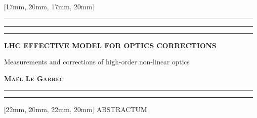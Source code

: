 \documentclass[coverheight=240mm,
               coverwidth=175mm, 
               spinewidth=15mm,
               markcolor=black,
               bleedwidth=0mm,
               marklength=0mm]{bookcover}
\begin{document}
    
\begin{bookcover}








[17mm, 20mm, 17mm, 20mm] %
{
    \noindent\rule[0.5em]{\partwidth}{1.5pt}\vspace{-22pt}
    \noindent\rule[0.5em]{\partwidth}{1.5pt}\vspace{-22pt}
    \noindent\rule[0.5em]{\partwidth}{1.5pt}
    \vspace{0.5cm}
    \fontsize{33pt}{30pt}\selectfont%
    \begin{flushright}%
        \bfseries
        \MakeUppercase{
            LHC Effective Model for Optics Corrections
        }%
    \end{flushright}
    \vspace{.1em}
    \fontsize{11pt}{15pt}\selectfont%
    \begin{flushright}%
        Measurements and corrections of high-order non-linear optics
    \end{flushright}
    \vfill
    \fontsize{15pt}{0pt}\selectfont%
    \bfseries\noindent\scshape Maël Le Garrec
    \par
    \vspace{0.3em}
    \noindent\rule[0.5em]{\partwidth}{1.5pt}\vspace{-2pt}
    \noindent\rule[0.5em]{\partwidth}{1.5pt}
}


[22mm, 20mm, 22mm, 20mm]{
{\centering\large ABSTRACTUM\\[5mm]}
\lipsum[1-4]}
\end{bookcover}
\end{document}
